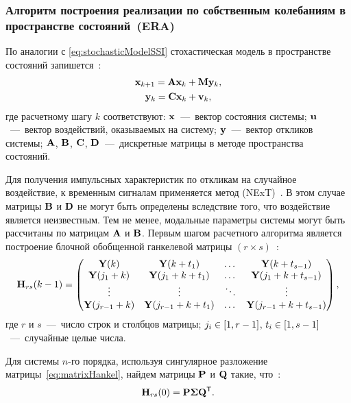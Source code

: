\subsubsection{Алгоритм построения реализации по собственным колебаниям в пространстве состояний~(ERA)}

По аналогии с \eqref{eq:stochasticModelSSI} стохастическая модель в пространстве состояний запишется~\cite{lib:oma:Juang&Pappa}:
\begin{equation}
	\begin{gathered}
		\mathbf{x}_{k + 1} = \mathbf{A} \mathbf{x}_k + \mathbf{M} \mathbf{y}_k, \\
		\mathbf{y}_k = \mathbf{C} \mathbf{x}_k + \mathbf{v}_k,
	\end{gathered}
\end{equation}
где расчетному шагу $ k $ соответствуют: $ \mathbf{x} $~---~вектор состояния системы; $ \mathbf{u} $~---~вектор воздействий, оказываемых на систему; $ \mathbf{y} $~---~вектор откликов системы; $ \mathbf{A} $, $ \mathbf{B} $, $ \mathbf{C} $, $ \mathbf{D} $~---~дискретные матрицы в методе пространства состояний.

Для получения импульсных характеристик по откликам на случайное воздействие, к временным сигналам применяется метод  (NExT)~\cite{lib:oma:Lin}. В этом случае матрицы $ \mathbf{B} $ и $ \mathbf{D} $ не могут быть определены вследствие того, что воздействие является неизвестным. Тем не менее, модальные параметры системы могут быть рассчитаны по матрицам $ \mathbf{A} $ и $ \mathbf{B} $. Первым шагом расчетного алгоритма является построение блочной обобщенной ганкелевой матрицы $ (r \times s) $~\cite{lib:oma:Caicedo}:
\begin{equation}
	\mathbf{H}_{rs}(k - 1) = 
	\begin{pmatrix}
		\mathbf{Y}(k) & \mathbf{Y}(k + t_1) & \dots & \mathbf{Y}(k + t_{s - 1}) \\
		\mathbf{Y}(j_1 + k) & \mathbf{Y}(j_1 + k + t_1) & \dots & \mathbf{Y}(j_1 + k + t_{s - 1}) \\
		\vdots & \vdots & \ddots & \vdots \\
		\mathbf{Y}(j_{r - 1} + k) & \mathbf{Y}(j_{r - 1} + k + t_1) & \dots & \mathbf{Y}(j_{r - 1} + k + t_{s - 1})
	\end{pmatrix}, \label{eq:matrixHankel}
\end{equation}
где $ r $ и $ s $~---~число строк и столбцов матрицы; $ j_i \in \left[ 1, r - 1 \right] $, $ t_i \in \left[ 1, s - 1 \right] $~---~случайные целые числа.

Для системы $ n $-го порядка, используя сингулярное разложение матрицы~\eqref{eq:matrixHankel}, найдем матрицы $ \mathbf{P} $ и $ \mathbf{Q} $ такие, что~\cite{lib:oma:Caicedo}:
\begin{equation}
	\mathbf{H}_{rs}(0) = \mathbf{P} \mathbf{\Sigma} \mathbf{Q} ^ \mathsf{T}.
\end{equation}


